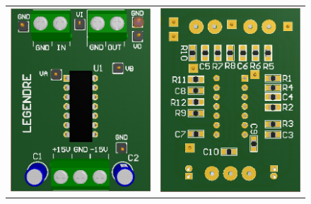 \begin{figure}[H]
    \centering
    \begin{tabular}{c c}
        \includegraphics[scale=0.5]{../EJ1/Recursos/legendre_top_3d.PNG} & 
        \includegraphics[scale=0.5]{../EJ1/Recursos/legendre_bottom_3d.PNG} \\

\end{tabular}
\end{figure}
